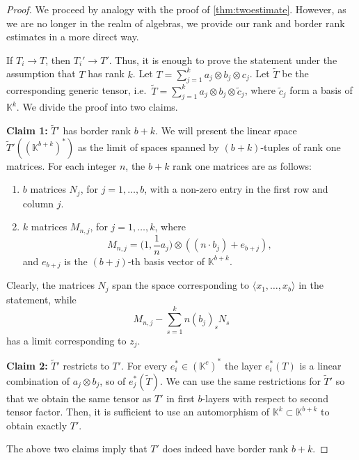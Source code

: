 \documentclass[a4paper,11pt,reqno]{amsart}
\newcommand{\bbK}{\mathbb{K}}
\renewcommand{\tilde}[1]{\widetilde{#1}}
\newcommand{\oldtext}[1]{\textcolor{darkelectricblue}{#1}}
\newcommand{\cfchange}[1]{\textcolor{blue}{#1}}
\numberwithin{equation}{section}
\theoremstyle{definition}
\theoremstyle{plain}
\theoremstyle{remark}
\begin{document}
\begin{proof}
We proceed {by analogy with} the proof of \autoref{thm:twoestimate}. However, as we are no longer in the realm of algebras, we provide our rank and border rank estimates in a more direct way.

{If} $T_i\rightarrow T$, then $T_i'\rightarrow T'$. Thus, it is enough to
prove the statement under the assumption that $T$ has rank $k$. Let
$T=\sum_{j=1}^k a_j\otimes b_j\otimes c_j$. Let $\tilde T$ be the
corresponding generic tensor, i.e.~$\tilde T=\sum_{j=1}^k a_j\otimes
b_j\otimes \tilde c_j$, where $\tilde c_j$ form a basis of
$\bbK^{k}$. %
We divide the proof into two claims.

    {\textbf{Claim 1:}} $\tilde T'$ has border rank $b+k$. We will present the linear space $\tilde T'((\bbK^{b+k})^*)$ as the limit of spaces spanned by $(b+k)$-tuples of rank one matrices. For each integer $n$, the $b+k$ rank one matrices are as follows:
\begin{enumerate}[label=(\arabic*), left= 3pt, widest=2,nosep]
\item $b$ matrices $N_{j}$, for $j=1,\dots,b$, with {a non-zero} entry in the first row and column $j$.
\item $k$ matrices $M_{n,j}$, for $j=1,\dots, k$,
{where
\[M_{n,j}=\biggl(1,\frac{1}{n}a_j\biggr)\otimes \left((n\cdot b_j)+e_{b+j}\right),\] and $e_{b+j}$ is the $(b+j)$-th basis vector of $\bbK^{b+k}$.}
\end{enumerate}
{Clearly,} the matrices $N_j$ span the space corresponding to $\langle x_1,\dots,x_b\rangle$ in the statement, while {\[M_{n,j}-\sum_{s=1}^k n(b_j)_sN_s\] has a limit corresponding to $z_j$.}

    {\textbf{Claim 2:}} $\tilde T'$ restricts to $T'$. For every $e_i^*\in (\bbK^c)^*$ the layer $e_i^*(T)$ is a linear combination of $a_j\otimes b_j$, {so} of $e_j^*(\tilde T)$. We {can} use the same restrictions {for $\tilde T'$ so that we obtain the same tensor as $T'$ in first $b$-layers with respect to second tensor factor.}
    Then, it is {sufficient} to use an automorphism of $\bbK^k\subset\bbK^{b+k}$ to obtain exactly $T'$.

    The {above two claims} imply that $T'$ {does indeed have} border rank $b+k$.
\end{proof}
\end{document}
